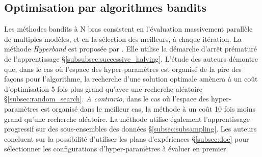 \subsection{Optimisation par algorithmes bandits} \label{subsec:bandit}
Les méthodes bandits à N bras consistent en l'évaluation massivement parallèle de multiples modèles, et en la sélection des meilleurs, à chaque itération.
La méthode \textit{Hyperband} est proposée par \citeauthor{li_hyperband_2016} \cite{li_hyperband_2016}.
Elle utilise la démarche d'arrêt prématuré de l'apprentissage §\ref{subsubsec:successive_halving}.
L'étude des auteurs démontre que, dans le cas où l'espace des hyper-paramètres est organisé de la pire des façons pour l'algorithme, la recherche d'une solution optimale amènera à un coût d'optimisation 5 fois plus grand qu'avec une recherche aléatoire §\ref{subsec:random_search}.
\textit{A contrario}, dans le cas où l'espace des hyper-paramètres est organisé dans le meilleur cas, la méthode à un coût 10 fois moins grand qu'une recherche aléatoire.
La méthode utilise également l'apprentissage progressif sur des sous-ensembles des données §\ref{subsec:subsampling}.
Les auteurs concluent sur la possibilité d'utiliser les plans d'expériences §\ref{subsec:doe} pour sélectionner les configurations d'hyper-paramètres à évaluer en premier.
%
%

